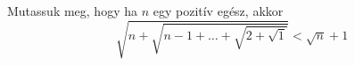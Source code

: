    Mutassuk meg, hogy ha $n$ egy pozitív egész, akkor
   \begin{equation*}
      \sqrt{ n + \sqrt{ n-1 + \hdots  +\sqrt{ 2 + \sqrt{1} } } } < \sqrt{n}+1
   \end{equation*}
